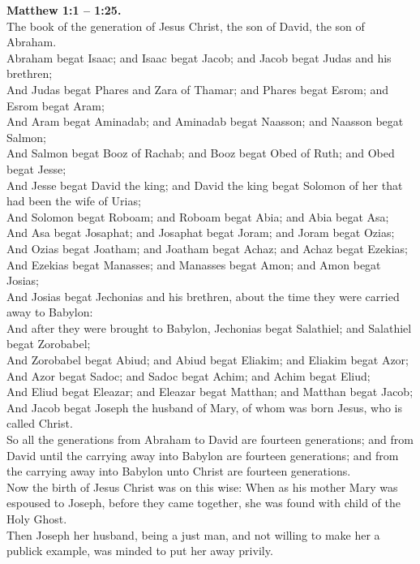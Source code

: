 \documentclass[10pt]{article} %
\begin{document}
{\begin{minipage}[t]{0.47\textwidth}
\textbf{Matthew 1:1 -- 1:25.}\\
The book of the generation of Jesus Christ, the son of David, the son of Abraham.\\
Abraham begat Isaac; and Isaac begat Jacob; and Jacob begat Judas and his brethren;\\
And Judas begat Phares and Zara of Thamar; and Phares begat Esrom; and Esrom begat Aram;\\
And Aram begat Aminadab; and Aminadab begat Naasson; and Naasson begat Salmon;\\
And Salmon begat Booz of Rachab; and Booz begat Obed of Ruth; and Obed begat Jesse;\\
And Jesse begat David the king; and David the king begat Solomon of her that had been the wife of Urias;\\
And Solomon begat Roboam; and Roboam begat Abia; and Abia begat Asa;\\
And Asa begat Josaphat; and Josaphat begat Joram; and Joram begat Ozias;\\
And Ozias begat Joatham; and Joatham begat Achaz; and Achaz begat Ezekias;\\
And Ezekias begat Manasses; and Manasses begat Amon; and Amon begat Josias;\\
And Josias begat Jechonias and his brethren, about the time they were carried away to Babylon:\\
And after they were brought to Babylon, Jechonias begat Salathiel; and Salathiel begat Zorobabel;\\
And Zorobabel begat Abiud; and Abiud begat Eliakim; and Eliakim begat Azor;\\
And Azor begat Sadoc; and Sadoc begat Achim; and Achim begat Eliud;\\
And Eliud begat Eleazar; and Eleazar begat Matthan; and Matthan begat Jacob;\\
And Jacob begat Joseph the husband of Mary, of whom was born Jesus, who is called Christ.\\
So all the generations from Abraham to David are fourteen generations; and from David until the carrying away into Babylon are fourteen generations; and from the carrying away into Babylon unto Christ are fourteen generations.\\
Now the birth of Jesus Christ was on this wise: When as his mother Mary was espoused to Joseph, before they came together, she was found with child of the Holy Ghost.\\
Then Joseph her husband, being a just man, and not willing to make her a publick example, was minded to put her away privily.\\

\end{minipage}}
\end{document}

